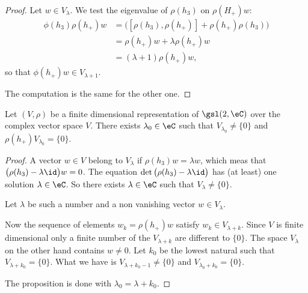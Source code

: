 \begin{proof}
    Let \( w\in V_{\lambda}\). We test the eigenvalue of \( \rho(h_3)\) on \( \rho(H_+)w\):
    \begin{subequations}
        \begin{align}
            \phi(h_3)\rho(h_+)w&=\big( [\rho(h_3),\rho(h_+)]+\rho(h_+)\rho(h_3) \big)\\
            &=\rho(h_+)w+\lambda\rho(h_+)w\\
            &=(\lambda+1)\rho(h_+)w,
        \end{align}
    \end{subequations}
    so that \( \phi(h_+)w\in V_{\lambda+1}\).

    The computation is the same for the other one.
\end{proof}

\begin{lemma}           \label{LEMooWXDYooUyijnm}
    Let \( (V,\rho)\) be a finite dimensional representation of \( \gsl(2,\eC)\) over the complex vector space \( V\). There exists \( \lambda_0\in \eC\) such that \( V_{\lambda_0}\neq \{ 0 \}\) and \( \rho(h_+)V_{\lambda_0}=\{ 0 \}\).
\end{lemma}

\begin{proof}
    A vector \( w\in V\) belong to \( V_{\lambda}\) if \( \rho(h_3)w=\lambda w\), which meas that \( \big( \rho(h_3)-\lambda\id \big)w=0\). The equation \( \det\big( \rho(h_3)-\lambda\id \big)\) has (at least) one solution \( \lambda\in \eC\). So there exists \( \lambda\in \eC\) such that \( V_{\lambda}\neq \{ 0 \}\). 
    
    Let \( \lambda\) be such a number and a non vanishing vector \( w\in V_{\lambda}\).

    Now the sequence of elements \( w_k= \rho(h_+)w   \) satisfy \( w_k\in V_{\lambda+k}\). Since \( V\) is finite dimensional only a finite number of the \( V_{\lambda+k}\) are different to \( \{ 0 \}\). The space \( V_{\lambda}\) on the other hand contains \( w\neq 0\). Let \( k_0\) be the lowest natural such that \( V_{\lambda+k_0}=\{ 0 \}\). What we have is \( V_{\lambda+k_0-1}\neq \{ 0 \}\) and \( V_{\lambda_0+k_0}=\{ 0 \}\).

    The proposition is done with \( \lambda_0=\lambda+k_0\).
\end{proof}

